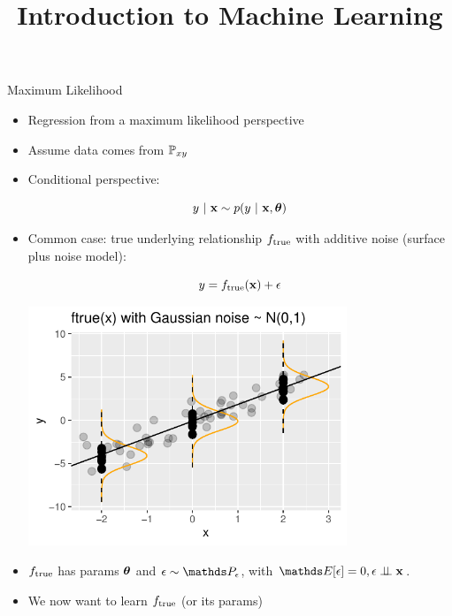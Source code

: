 \documentclass[11pt,compress,t,notes=noshow, xcolor=table]{beamer}
\title{Introduction to Machine Learning}
\begin{document}
    

\begin{vbframe}{Maximum Likelihood}

\begin{itemize}
\item Regression from a maximum likelihood perspective
\item Assume data comes from $\mathbb{P}_{xy}$ 
\item Conditional perspective: 

$$
	y~|~ \mathbf{x} \sim p(y~|~\mathbf{x}, \bm{\theta})
$$

\item
Common case:
true underlying relationship $f_{\text{true}}$ with additive noise (surface plus noise model): 

\begin{minipage}{0.5\textwidth}
$$
y = f_{\text{true}}(\mathbf{x}) + \epsilon
$$
\end{minipage}%
\begin{minipage}{0.5\textwidth}
\includegraphics[width = 0.75\textwidth]{figure/ftrue.pdf}
\end{minipage}

\item $f_{\text{true}}$ has params $\bm{\theta}$ and $\eps \sim\P_\eps$, with $\E[\eps] = 0, \epsilon \perp \!\!\! \perp \xv$.

\item We now want to learn $f_{\text{true}}$ (or its params)


\end{itemize}
\end{vbframe}
\end{document}
